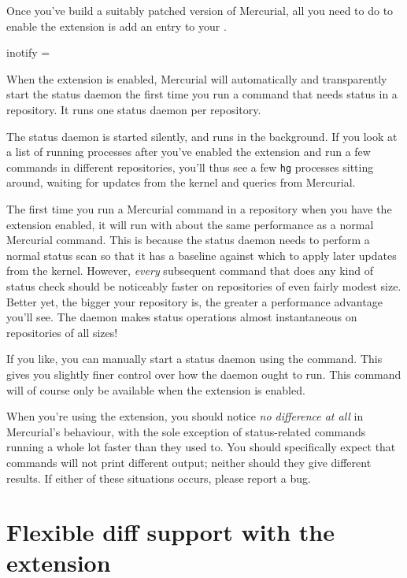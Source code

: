 Once you've build a suitably patched version of Mercurial, all you
need to do to enable the  extension is add an entry to
your \hgrc.
\begin{codesample2}
  [extensions]
  inotify =
\end{codesample2}
When the  extension is enabled, Mercurial will
automatically and transparently start the status daemon the first time
you run a command that needs status in a repository.  It runs one
status daemon per repository.

The status daemon is started silently, and runs in the background.  If
you look at a list of running processes after you've enabled the
 extension and run a few commands in different
repositories, you'll thus see a few \texttt{hg} processes sitting
around, waiting for updates from the kernel and queries from
Mercurial.

The first time you run a Mercurial command in a repository when you
have the  extension enabled, it will run with about the
same performance as a normal Mercurial command.  This is because the
status daemon needs to perform a normal status scan so that it has a
baseline against which to apply later updates from the kernel.
However, \emph{every} subsequent command that does any kind of status
check should be noticeably faster on repositories of even fairly
modest size.  Better yet, the bigger your repository is, the greater a
performance advantage you'll see.  The  daemon makes
status operations almost instantaneous on repositories of all sizes!

If you like, you can manually start a status daemon using the
 command.  This gives you slightly finer control over
how the daemon ought to run.  This command will of course only be
available when the  extension is enabled.

When you're using the  extension, you should notice
\emph{no difference at all} in Mercurial's behaviour, with the sole
exception of status-related commands running a whole lot faster than
they used to.  You should specifically expect that commands will not
print different output; neither should they give different results.
If either of these situations occurs, please report a bug.

\section{Flexible diff support with the  extension}
\label{sec:hgext:extdiff}

